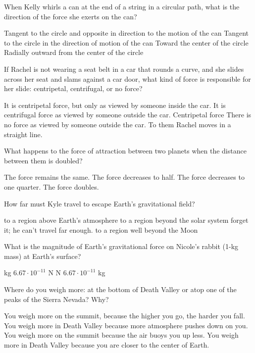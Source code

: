 \documentclass{exam}
\begin{document}
\begin{questions}
\newpage{}

\question When Kelly whirls a can at the end of a string in a circular path, what is the direction of the force she exerts on the can?  
\begin{choices}
  \choice Tangent to the circle and opposite in direction to the motion of the can 
  \choice Tangent to the circle in the direction of motion of the can 
  \choice Toward the center of the circle 
  \choice Radially outward from the center of the circle 
\end{choices}
\vfill{}

\question If Rachel is not wearing a seat belt in a car that rounds a curve, and she slides across her seat and slams against a car door, what kind of force is responsible for her slide: centripetal, centrifugal, or no force?  
\begin{choices}
  \choice It is centripetal force, but only as viewed by someone inside the car. 
  \choice It is centrifugal force as viewed by someone outside the car. 
  \choice Centripetal force 
  \choice There is no force as viewed by someone outside the car. To them Rachel moves in a straight line. 
\end{choices}
\vfill{}

\question What happens to the force of attraction between two planets when the distance between them is doubled? 
\begin{choices}
  \choice The force remains the same. 
  \choice The force decreases to half. 
  \choice The force decreases to one quarter. 
  \choice The force doubles. 
\end{choices}
\vfill{}

\question How far must Kyle travel to escape Earth's gravitational field?
\begin{choices}
  \choice to a region above Earth's atmosphere
  \choice to a region beyond the solar system
  \choice forget it; he can't travel far enough.
  \choice to a region well beyond the Moon
\end{choices}
\vfill{}

\question  What is the magnitude of Earth's gravitational force on Nicole's rabbit (1-kg mass) at Earth's surface? 
\begin{choices}
   kg 
  \choice \(6.67\cdot10^{-11}\) N 
   N 
  \choice \(6.67\cdot10^{-11}\) kg 
\end{choices}
\vfill{}

\question Where do you weigh more: at the bottom of Death Valley or atop one of the peaks of the Sierra Nevada? Why?  
\begin{choices}
  \choice You weigh more on the summit, because the higher you go, the harder you fall. 
  \choice You weigh more in Death Valley because more atmosphere pushes down on you. 
  \choice You weigh more on the summit because the air buoys you up less. 
  \choice You weigh more in Death Valley because you are closer to the center of Earth. 
\end{choices}
\vfill{}


\end{questions}
\end{document}
